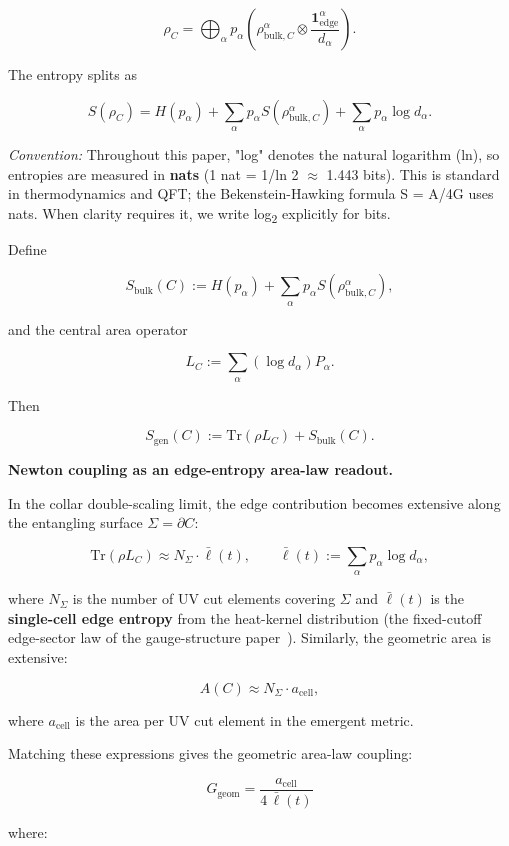 \[
\rho_C = \bigoplus_{\alpha} p_{\alpha}
\left(\rho_{\mathrm{bulk},C}^{\alpha} \otimes \frac{\mathbf 1_{\mathrm{edge}}^{\alpha}}{d_{\alpha}}\right).
\]

The entropy splits as

\[
S(\rho_C) = H(p_{\alpha}) + \sum_{\alpha} p_{\alpha} S(\rho_{\mathrm{bulk},C}^{\alpha}) + \sum_{\alpha} p_{\alpha} \log d_{\alpha}.
\]

\emph{Convention:} Throughout this paper, "log" denotes the natural logarithm (ln), so entropies are measured in \textbf{nats} (1 nat = 1/ln 2 \ensuremath{\approx} 1.443 bits). This is standard in thermodynamics and QFT; the Bekenstein-Hawking formula S = A/4G uses nats. When clarity requires it, we write log\textsubscript{2} explicitly for bits.

Define

\[
S_{\mathrm{bulk}}(C) := H(p_{\alpha}) + \sum_{\alpha} p_{\alpha} S(\rho_{\mathrm{bulk},C}^{\alpha}),
\]

and the central area operator

\[
L_C := \sum_{\alpha} (\log d_{\alpha}) P_{\alpha}.
\]

Then

\[
S_{\mathrm{gen}}(C) := \mathrm{Tr}(\rho L_C) + S_{\mathrm{bulk}}(C).
\]

\textbf{Newton coupling as an edge-entropy area-law readout.}

In the collar double-scaling limit, the edge contribution becomes extensive along the entangling surface \(\Sigma = \partial C\):

\[
\mathrm{Tr}(\rho L_C) \approx N_\Sigma \cdot \bar{\ell}(t),
\qquad
\bar{\ell}(t) := \sum_\alpha p_\alpha \log d_\alpha,
\]

where \(N_\Sigma\) is the number of UV cut elements covering \(\Sigma\) and \(\bar{\ell}(t)\) is the \textbf{single-cell edge entropy} from the heat-kernel distribution (the fixed-cutoff edge-sector law of the gauge-structure paper~\cite{ophGauge}). Similarly, the geometric area is extensive:

\[
A(C) \approx N_\Sigma \cdot a_{\mathrm{cell}},
\]

where \(a_{\mathrm{cell}}\) is the area per UV cut element in the emergent metric.

Matching these expressions gives the geometric area-law coupling:

\[
G_{\mathrm{geom}} = \frac{a_{\mathrm{cell}}}{4 \, \bar{\ell}(t)}
\]

where:

